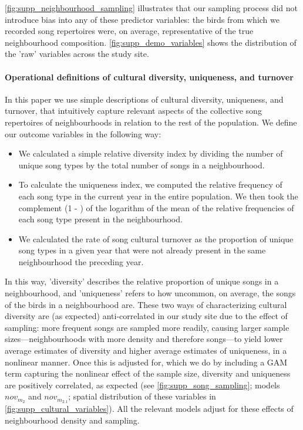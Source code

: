 \documentclass[9pt, onecolumn, twoside, lineno]{gsajnl}
\begin{document}
\noindent\autoref{fig:supp_neighbourhood_sampling} illustrates that our sampling process did not introduce bias into any of these predictor variables: the birds from which we recorded song repertoires were, on average, representative of the true neighbourhood composition. \autoref{fig:supp_demo_variables} shows the distribution of the 'raw' variables across the study site.

\paragraph{Operational definitions of cultural diversity, uniqueness, and turnover}

In this paper we use simple descriptions of cultural diversity, uniqueness, and turnover, that intuitively capture relevant aspects of the collective song repertoires of neighbourhoods in relation to the rest of the population. We define our outcome variables in the following way:
\begin{itemize}
    \item We calculated a simple relative diversity index by dividing the number of unique song types by the total number of songs in a neighbourhood. 
    \item To calculate the uniqueness index, we computed the relative frequency of each song type in the current year in the entire population. We then took the complement (1 - ) of the logarithm of the mean of the relative frequencies of each song type present in the neighbourhood. 
    \item We calculated the rate of song cultural turnover as the proportion of unique song types in a given year that were not already present in the same neighbourhood the preceding year.
\end{itemize}

In this way, 'diversity' describes the relative proportion of unique songs in a neighbourhood, and 'uniqueness' refers to how uncommon, on average, the songs of the birds in a neighbourhood are. These two ways of characterizing cultural diversity are (as expected) anti-correlated in our study site due to the effect of sampling: more frequent songs are sampled more readily, causing larger sample sizes---neighbourhoods with more density and therefore songs---to yield lower average estimates of diversity and higher average estimates of uniqueness, in a nonlinear manner. Once this is adjusted for, which we do by including  a GAM term capturing the nonlinear effect of the sample size, diversity and uniqueness are positively correlated, as expected (see \autoref{fig:supp_song_sampling}; models $nov_{m_2}$ and $nov_{m_{2.1}}$; spatial distribution of these variables in \autoref{fig:supp_cultural_variables}). All the relevant models adjust for these effects of neighbourhood density and sampling.
\end{document}
